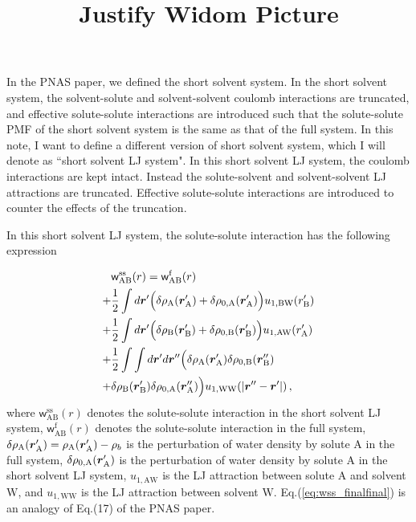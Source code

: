 \documentclass[9pt]{article}
\renewcommand{\vec}[1]{\mbox{\boldmath$#1$}}
\newcommand{\A}{\mathrm{A}}
\newcommand{\W}{\mathrm{W}}
\newcommand{\B}{\mathrm{B}}
\newcommand{\f}{\mathrm{f}}
\newcommand{\sss}{\mathrm{ss}}
\newcommand{\w}{\mathsf{w}}
\begin{document}
\title{Justify Widom Picture}
\maketitle

In the PNAS paper, we defined the short solvent system. In the short solvent system, the solvent-solute and solvent-solvent coulomb interactions are truncated, and effective solute-solute interactions are introduced such that the solute-solute PMF of the short solvent system is the same as that of the full system. In this note, I want to define a different version of short solvent system, which I will denote as ``short solvent LJ system". In this short solvent LJ system, the coulomb interactions are kept intact. Instead the solute-solvent and solvent-solvent LJ attractions are truncated. Effective solute-solute interactions are introduced to counter the effects of the truncation.

In this short solvent LJ system, the solute-solute interaction has the following expression

\begin{align}
\begin{split}
 & \w_{\A\B}^{\sss}(r) =  \w_{\A\B}^{\f}(r) \\
+ & \frac{1}{2} \int d \vec{r}'\Big(\delta \rho_{\A}(\vec{r}_{\A}') + \delta \rho_{0, \A}(\vec{r}_{\A}')\Big) u_{1,\B\W}(r_{\B}') \\
 +&  \frac{1}{2} \int d \vec{r}'\Big( \delta \rho_{\B}(\vec{r}_{\B}') + \delta \rho_{0, \B}(\vec{r}_{\B}')\Big) u_{1,\A\W}(r_{\A}') \\
 + &  \frac{1}{2} \int \int d \vec{r}' d \vec{r}'' \Big( \delta \rho_{\A}(\vec{r}_{\A}') \delta \rho_{0, \B}(\vec{r}_{\B}'') \\
 + & \delta \rho_{\B}(\vec{r}_{\B}') \delta \rho_{0, \A}(\vec{r}_{\A}'') \Big) u_{1,\W\W}(|\vec{r}'' - \vec{r}'|) \,,
\end{split}
\label{eq:wss_finalfinal}
\end{align}
where $\w_{\A\B}^{\sss}(r)$ denotes the solute-solute interaction in the short solvent LJ system,  $\w_{\A\B}^{\f}(r)$ denotes the solute-solute interaction in the full system, $\delta \rho_{\A}(\vec{r}_{\A}') = \rho_{\A}(\vec{r}_{\A}') - \rho_b$ is the perturbation of water density by solute A in the full system, $\delta \rho_{0, \A}(\vec{r}_{\A}')$ is the perturbation of water density by solute A in the short solvent LJ system, $u_{1,\A\W}$ is the LJ attraction between solute $\A$ and solvent $\W$, and $u_{1,\W\W}$ is the LJ attraction between solvent $\W$. Eq.(\ref{eq:wss_finalfinal}) is an analogy of Eq.(17) of the PNAS paper.
\end{document}
